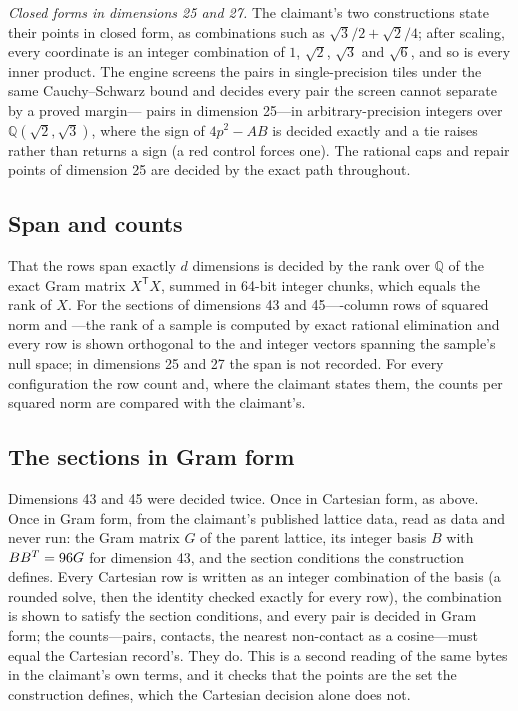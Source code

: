 \documentclass[preprint,11pt,authoryear,a4paper]{elsarticle}
\newcommand{\Q}{\mathbb{Q}}
\begin{document}
\emph{Closed forms in dimensions 25 and 27.} The claimant's two constructions state their points in closed form, as combinations such as $\sqrt3/2+\sqrt2/4$; after scaling, every coordinate is an integer combination of $1$, $\sqrt2$, $\sqrt3$ and $\sqrt6$, and so is every inner product. The engine screens the pairs in single-precision tiles under the same Cauchy--Schwarz bound and decides every pair the screen cannot separate by a proved margin---\MtKwObjFallbacks{} pairs in dimension 25---in arbitrary-precision integers over $\Q(\sqrt2,\sqrt3)$, where the sign of $4p^2-AB$ is decided exactly and a tie raises rather than returns a sign (a red control forces one). The \QkDTwentyFiveObjectRows{} rational caps and repair points of dimension 25 are decided by the exact path throughout.

\subsection{Span and counts}\label{sec:span}
That the rows span exactly $d$ dimensions is decided by the rank over $\Q$ of the exact Gram matrix $X^{\mathsf T}X$, summed in 64-bit integer chunks, which equals the rank of $X$. For the sections of dimensions 43 and 45---\QkSectionColumns-column rows of squared norm \QkDFortyThreeNorm{} and \QkDFortyFiveNorm---the rank of a sample is computed by exact rational elimination and every row is shown orthogonal to the \QkDFortyThreeNull{} and \QkDFortyFiveNull{} integer vectors spanning the sample's null space; in dimensions 25 and 27 the span is not recorded. For every configuration the row count and, where the claimant states them, the counts per squared norm are compared with the claimant's.

\subsection{The sections in Gram form}\label{sec:gram}
Dimensions 43 and 45 were decided twice. Once in Cartesian form, as above. Once in Gram form, from the claimant's published lattice data, read as data and never run: the Gram matrix $G$ of the parent lattice, its integer basis $B$ with $B B^T = 96 G$ for dimension 43, and the section conditions the construction defines. Every Cartesian row is written as an integer combination of the basis (a rounded solve, then the identity checked exactly for every row), the combination is shown to satisfy the section conditions, and every pair is decided in Gram form; the counts---pairs, contacts, the nearest non-contact as a cosine---must equal the Cartesian record's. They do. This is a second reading of the same bytes in the claimant's own terms, and it checks that the points are the set the construction defines, which the Cartesian decision alone does not.
\end{document}
